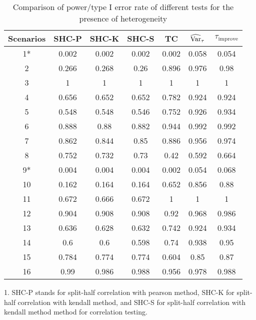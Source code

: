     \begin{table}[htbp]
    \caption{Comparison of power/type I error rate of different tests for the presence of heterogeneity}
    \centering
      \begin{threeparttable}
          \begin{tabular}{c|cccccc}
          \toprule
          Scenarios & SHC-P & SHC-K & SHC-S & TC & $\operatorname{\widehat{Var}}_{\tau}$ & $\tau_{\mathrm{improve}}$ \\
          \midrule
          1*    & 0.002 & 0.002 & 0.002 & 0.002 & 0.058 & 0.054 \\
          2     & 0.266 & 0.268 & 0.26  & 0.896 & 0.976 & 0.98 \\
          3     & 1     & 1     & 1     & 1     & 1     & 1 \\
          4     & 0.656 & 0.652 & 0.652 & 0.782 & 0.924 & 0.924 \\
          5     & 0.548 & 0.548 & 0.546 & 0.752 & 0.926 & 0.934 \\
          6     & 0.888 & 0.88  & 0.882 & 0.944 & 0.992 & 0.992 \\
          7     & 0.862 & 0.844 & 0.85  & 0.886 & 0.956 & 0.974 \\
          8     & 0.752 & 0.732 & 0.73  & 0.42  & 0.592 & 0.664 \\
          9*    & 0.004 & 0.004 & 0.004 & 0.002 & 0.054 & 0.068 \\
          10    & 0.162 & 0.164 & 0.164 & 0.652 & 0.856 & 0.88 \\
          11    & 0.672 & 0.666 & 0.672 & 1     & 1     & 1 \\
          12    & 0.904 & 0.908 & 0.908 & 0.92  & 0.968 & 0.986 \\
          13    & 0.636 & 0.628 & 0.632 & 0.742 & 0.924 & 0.934 \\
          14    & 0.6   & 0.6   & 0.598 & 0.74  & 0.938 & 0.95 \\
          15    & 0.784 & 0.774 & 0.774 & 0.604 & 0.85  & 0.87 \\
          16    & 0.99  & 0.986 & 0.988 & 0.956 & 0.978 & 0.988 \\
          \bottomrule
          \end{tabular}%
          \begin{tablenotes}
            \small
            \item 1. SHC-P stands for split-half correlation with pearson method, SHC-K for split-half correlation with kendall method, and SHC-S for split-half correlation with kendall method method for correlation testing.

\end{tablenotes}
\end{threeparttable}
\end{table}
